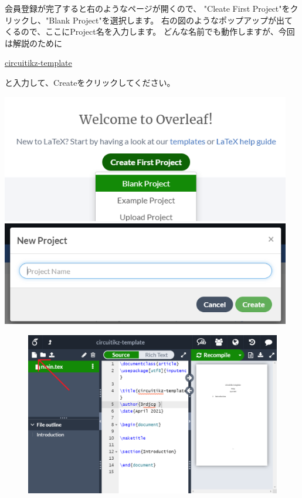 		\newpage
		\noindent
		\begin{minipage}{0.4\hsize}%
			会員登録が完了すると右のようなページが開くので、
			"Cleate First Project"をクリックし、"Blank Project"を選択します。
			右の図のようなポップアップが出てくるので、ここにProject名を入力します。
			どんな名前でも動作しますが、今回は解説のために
			\begin{mdframed}[style=shadow]
				\url{circuitikz-template}
			\end{mdframed}\vspace{-3mm}
			と入力して、Createをクリックしてください。
		\end{minipage}\hfill
		\begin{minipage}{0.6\hsize}
			\begin{flushright}
				\includegraphics[width=0.95\textwidth]{figure/overleaf-page-createproject.png}\\
				\vspace{3mm}
				\includegraphics[width=0.95\textwidth]{figure/overleaf-page-projectname.png}
			\end{flushright}
		\end{minipage}
		
		\begin{figure}[H]
			\centering
			\includegraphics[width=\textwidth]{figure/overleaf-editer-initial.png}
		\end{figure}
		
